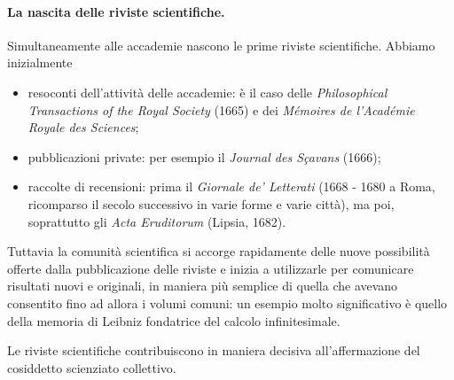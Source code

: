 \paragraph{La nascita delle riviste scientifiche.} Simultaneamente alle accademie nascono le prime riviste scientifiche. Abbiamo inizialmente
\begin{itemize}
	\item resoconti dell'attivit\`a delle accademie: \`e il caso delle \textit{Philosophical Transactions of the Royal Society} (1665) e dei \textit{M\'emoires de l'Acad\'emie Royale des Sciences};
	\item pubblicazioni private: per esempio il \textit{Journal des S\c{c}avans} (1666);
	\item raccolte di recensioni: prima il \textit{Giornale de' Letterati} (1668 - 1680 a Roma, ricomparso il secolo successivo in varie forme e varie citt\`a), ma poi, soprattutto gli \textit{Acta Eruditorum} (Lipsia, 1682).
\end{itemize}
\par Tuttavia la comunit\`a scientifica si accorge rapidamente delle nuove possibilit\`a offerte dalla pubblicazione delle riviste e inizia a utilizzarle per comunicare risultati nuovi e originali, in maniera pi\`u semplice di quella che avevano consentito fino ad allora i volumi comuni: un esempio molto significativo \`e quello della memoria di Leibniz fondatrice del calcolo infinitesimale.
\par Le riviste scientifiche contribuiscono in maniera decisiva all'affermazione del cosiddetto scienziato collettivo.
